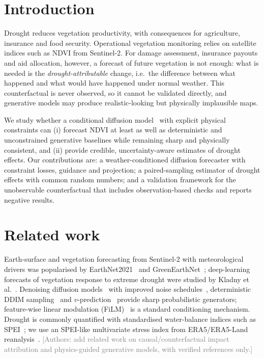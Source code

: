 \documentclass[10pt]{article}
\newcommand{\draftnote}[1]{\textcolor{gray}{[#1]}}
\begin{document}
\section{Introduction}
Drought reduces vegetation productivity, with consequences for agriculture, insurance and food security.
Operational vegetation monitoring relies on satellite indices such as NDVI from Sentinel-2. For damage assessment,
insurance payouts and aid allocation, however, a forecast of future vegetation is not enough: what is needed is the
\emph{drought-attributable} change, i.e.\ the difference between what happened and what would have happened under
normal weather. This counterfactual is never observed, so it cannot be validated directly, and generative models may
produce realistic-looking but physically implausible maps.

We study whether a conditional diffusion model~\cite{ho2020ddpm,song2021ddim} with explicit physical constraints can
(i) forecast NDVI at least as well as deterministic and unconstrained generative baselines while remaining sharp and
physically consistent, and (ii) provide credible, uncertainty-aware estimates of drought effects. Our contributions
are: a weather-conditioned diffusion forecaster with constraint losses, guidance and projection; a paired-sampling
estimator of drought effects with common random numbers; and a validation framework for the unobservable
counterfactual that includes observation-based checks and reports negative results.

\section{Related work}
Earth-surface and vegetation forecasting from Sentinel-2 with meteorological drivers was popularised by
EarthNet2021~\cite{requena2021earthnet} and GreenEarthNet~\cite{benson2024greenearthnet}; deep-learning forecasts of
vegetation response to extreme drought were studied by Kladny et al.~\cite{kladny2024enhanced}. Denoising diffusion
models~\cite{ho2020ddpm} with improved noise schedules~\cite{nichol2021improved}, deterministic DDIM
sampling~\cite{song2021ddim} and $v$-prediction~\cite{salimans2022progressive} provide sharp probabilistic
generators; feature-wise linear modulation (FiLM)~\cite{perez2018film} is a standard conditioning mechanism. Drought
is commonly quantified with standardised water-balance indices such as SPEI~\cite{vicente2010spei}; we use an
SPEI-like multivariate stress index from ERA5/ERA5-Land reanalysis~\cite{hersbach2020era5,munoz2021era5land}.
\draftnote{Authors: add related work on causal/counterfactual impact attribution and physics-guided generative
models, with verified references only.}
\end{document}
